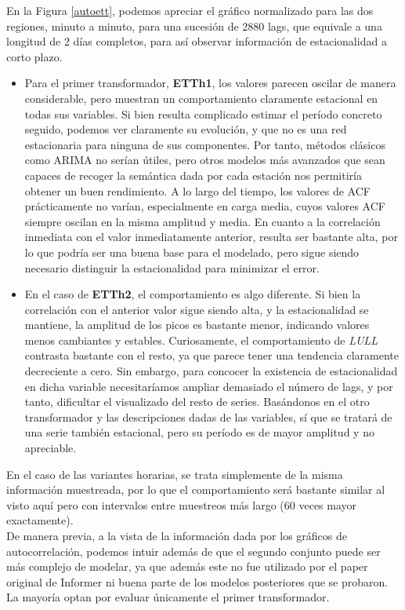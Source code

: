 En la Figura \ref{autoett}, podemos apreciar el gráfico normalizado para las dos regiones, minuto a minuto, para una sucesión de 2880 lags, que equivale a una longitud de 2 días completos, para así observar información de estacionalidad a corto plazo.

\begin{itemize}
	\item Para el primer transformador, \textbf{ETTh1}, los valores parecen oscilar de manera considerable, pero muestran un comportamiento claramente estacional en todas sus variables. Si bien resulta complicado estimar el período concreto seguido, podemos ver claramente su evolución, y que no es una red estacionaria para ninguna de sus componentes. Por tanto, métodos clásicos como ARIMA no serían útiles, pero otros modelos más avanzados que sean capaces de recoger la semántica dada por cada estación nos permitiría obtener un buen rendimiento. A lo largo del tiempo, los valores de ACF prácticamente no varían, especialmente en carga media, cuyos valores ACF siempre oscilan en la misma amplitud y media. En cuanto a la correlación inmediata con el valor inmediatamente anterior, resulta ser bastante alta, por lo que podría ser una buena base para el modelado, pero sigue siendo necesario distinguir la estacionalidad para minimizar el error.
	\item En el caso de \textbf{ETTh2}, el comportamiento es algo diferente. Si bien la correlación con el anterior valor sigue siendo alta, y la estacionalidad se mantiene, la amplitud de los picos es bastante menor, indicando valores menos cambiantes y estables. Curiosamente, el comportamiento de \textit{LULL} contrasta bastante con el resto, ya que parece tener una tendencia claramente decreciente a cero. Sin embargo, para concocer la existencia de estacionalidad en dicha variable necesitaríamos ampliar demasiado el número de lags, y por tanto, dificultar el visualizado del resto de series. Basándonos en el otro transformador y las descripciones dadas de las variables, sí que se tratará de una serie también estacional, pero su período es de mayor amplitud y no apreciable.
\end{itemize}

En el caso de las variantes horarias, se trata simplemente de la misma información muestreada, por lo que el comportamiento será bastante similar al visto aquí pero con intervalos entre muestreos más largo (60 veces mayor exactamente).\\

De manera previa, a la vista de la información dada por los gráficos de autocorrelación, podemos intuir además de que el segundo conjunto puede ser más complejo de modelar, ya que además este no fue utilizado por el paper original de Informer ni buena parte de los modelos posteriores que se probaron. La mayoría optan por evaluar únicamente el primer transformador.

